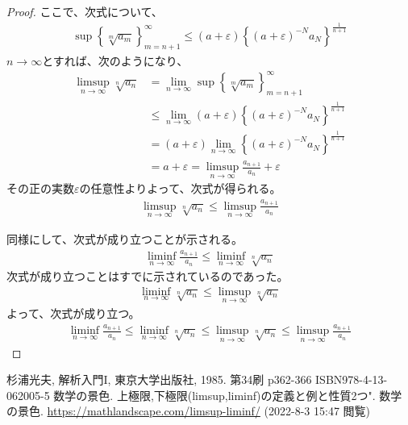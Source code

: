 \documentclass[dvipdfmx]{jsarticle}
\begin{document}
\begin{proof}
ここで、次式について、
\begin{align*}
\sup\left\{ \sqrt[m]{a_{m}} \right\}_{m = n + 1}^{\infty} \leq (a + \varepsilon)\left\{ (a + \varepsilon)^{- N}a_{N} \right\}^{\frac{1}{n + 1}}
\end{align*}
$n \rightarrow \infty$とすれば、次のようになり、
\begin{align*}
\limsup_{n \rightarrow \infty}\sqrt[n]{a_{n}} &= \lim_{n \rightarrow \infty}{\sup\left\{ \sqrt[m]{a_{m}} \right\}_{m = n + 1}^{\infty}}\\
&\leq \lim_{n \rightarrow \infty}{(a + \varepsilon)\left\{ (a + \varepsilon)^{- N}a_{N} \right\}^{\frac{1}{n + 1}}}\\
&= (a + \varepsilon)\lim_{n \rightarrow \infty}\left\{ (a + \varepsilon)^{- N}a_{N} \right\}^{\frac{1}{n + 1}}\\
&= a + \varepsilon = \limsup_{n \rightarrow \infty}\frac{a_{n + 1}}{a_{n}} + \varepsilon
\end{align*}
その正の実数$\varepsilon$の任意性よりよって、次式が得られる。
\begin{align*}
\limsup_{n \rightarrow \infty}\sqrt[n]{a_{n}} \leq \limsup_{n \rightarrow \infty}\frac{a_{n + 1}}{a_{n}}
\end{align*}\par
同様にして、次式が成り立つことが示される。
\begin{align*}
\liminf_{n \rightarrow \infty}\frac{a_{n + 1}}{a_{n}} \leq \liminf_{n \rightarrow \infty}\sqrt[n]{a_{n}}
\end{align*}
次式が成り立つことはすでに示されているのであった。
\begin{align*}
\liminf_{n \rightarrow \infty}\sqrt[n]{a_{n}} \leq \limsup_{n \rightarrow \infty}\sqrt[n]{a_{n}}
\end{align*}
よって、次式が成り立つ。
\begin{align*}
\liminf_{n \rightarrow \infty}\frac{a_{n + 1}}{a_{n}} \leq \liminf_{n \rightarrow \infty}\sqrt[n]{a_{n}} \leq \limsup_{n \rightarrow \infty}\sqrt[n]{a_{n}} \leq \limsup_{n \rightarrow \infty}\frac{a_{n + 1}}{a_{n}}
\end{align*}
\end{proof}
\begin{thebibliography}{50}
  杉浦光夫, 解析入門I, 東京大学出版社, 1985. 第34刷 p362-366 ISBN978-4-13-062005-5
  数学の景色. 上極限,下極限(limsup,liminf)の定義と例と性質2つ". 数学の景色. \url{https://mathlandscape.com/limsup-liminf/} (2022-8-3 15:47 閲覧)
\end{thebibliography}
\end{document}
